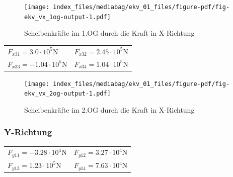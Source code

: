 \documentclass[
  letterpaper,
  DIV=11]{scrreprt}
\begin{document}
\begin{figure}[H]

{\centering \texttt{[image: index\_files/mediabag/ekv\_01\_files/figure-pdf/fig-ekv\_vx\_1og-output-1.pdf]}

}

\caption{\label{fig-ekv_vx_1og}Scheibenkräfte im 1.OG durch die Kraft in
X-Richtung}

\end{figure}

\newpage{}

\begin{longtable}[]{@{}
  >{\raggedright\arraybackslash}p{}
  >{\raggedright\arraybackslash}p{}@{}}
\toprule\noalign{}
\endhead
\bottomrule\noalign{}
\endlastfoot
\(F_{x 31} = 3.0 \cdot 10^{5} \text{N}\) &
\(F_{x 32} = 2.45 \cdot 10^{5} \text{N}\) \\
\(F_{x 33} = - 1.04 \cdot 10^{5} \text{N}\) &
\(F_{x 34} = 1.04 \cdot 10^{5} \text{N}\) \\
\end{longtable}

\begin{figure}[H]

{\centering \texttt{[image: index\_files/mediabag/ekv\_01\_files/figure-pdf/fig-ekv\_vx\_2og-output-1.pdf]}

}

\caption{\label{fig-ekv_vx_2og}Scheibenkräfte im 2.OG durch die Kraft in
X-Richtung}

\end{figure}

\newpage{}

\hypertarget{y-richtung-8}{%
\subsubsection{Y-Richtung}\label{y-richtung-8}}

\begin{longtable}[]{@{}
  >{\raggedright\arraybackslash}p{}
  >{\raggedright\arraybackslash}p{}@{}}
\toprule\noalign{}
\endhead
\bottomrule\noalign{}
\endlastfoot
\(F_{y 11} = - 3.28 \cdot 10^{4} \text{N}\) &
\(F_{y 12} = 3.27 \cdot 10^{4} \text{N}\) \\
\(F_{y 13} = 1.23 \cdot 10^{5} \text{N}\) &
\(F_{y 14} = 7.63 \cdot 10^{4} \text{N}\) \\
\end{longtable}
\end{document}

